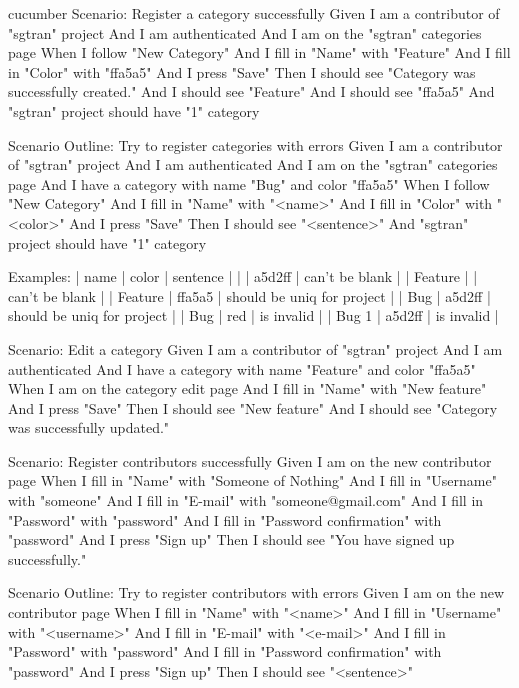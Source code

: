 \begin{mycode}{cucumber}
  Scenario: Register a category successfully
    Given I am a contributor of "sgtran" project
    And I am authenticated
    And I am on the "sgtran" categories page
    When I follow "New Category"
    And I fill in "Name" with "Feature"
    And I fill in "Color" with "ffa5a5"
    And I press "Save"
    Then I should see "Category was successfully created."
    And I should see "Feature"
    And I should see "ffa5a5"
    And "sgtran" project should have "1" category

  Scenario Outline: Try to register categories with errors
    Given I am a contributor of "sgtran" project
    And I am authenticated
    And I am on the "sgtran" categories page
    And I have a category with name "Bug" and color "ffa5a5"
    When I follow "New Category"
    And I fill in "Name" with "<name>"
    And I fill in "Color" with "<color>"
    And I press "Save"
    Then I should see "<sentence>"
    And "sgtran" project should have "1" category

    Examples:
    | name    | color  | sentence                   |
    |         | a5d2ff | can't be blank             |
    | Feature |        | can't be blank             |
    | Feature | ffa5a5 | should be uniq for project |
    | Bug     | a5d2ff | should be uniq for project |
    | Bug     | red    | is invalid                 |
    | Bug 1   | a5d2ff | is invalid                 |

  Scenario: Edit a category
    Given I am a contributor of "sgtran" project
    And I am authenticated
    And I have a category with name "Feature" and color "ffa5a5"
    When I am on the category edit page
    And I fill in "Name" with "New feature"
    And I press "Save"
    Then I should see "New feature"
    And I should see "Category was successfully updated."

  Scenario: Register contributors successfully
    Given I am on the new contributor page
    When I fill in "Name" with "Someone of Nothing"
    And I fill in "Username" with "someone"
    And I fill in "E-mail" with "someone@gmail.com"
    And I fill in "Password" with "password"
    And I fill in "Password confirmation" with "password"
    And I press "Sign up"
    Then I should see "You have signed up successfully."

  Scenario Outline: Try to register contributors with errors
    Given I am on the new contributor page
    When I fill in "Name" with "<name>"
    And I fill in "Username" with "<username>"
    And I fill in "E-mail" with "<e-mail>"
    And I fill in "Password" with "password"
    And I fill in "Password confirmation" with "password"
    And I press "Sign up"
    Then I should see "<sentence>"


\end{mycode}
